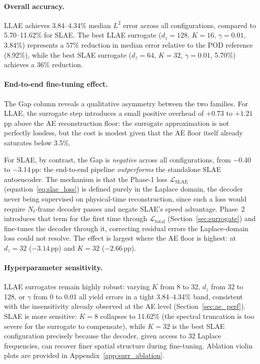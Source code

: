 ﻿\documentclass[a4paper,12pt]{article}
\theoremstyle{definition}
\theoremstyle{remark}
\begin{document}
\paragraph{Overall accuracy.}
LLAE achieves 3.84--4.34\% median $L^2$ error across all configurations, compared to 5.70--11.62\% for SLAE. The best LLAE surrogate ($d_z=128$, $K=16$, $\gamma=0.01$, 3.84\%) represents a $57\%$ reduction in median error relative to the POD reference (8.92\%), while the best SLAE surrogate ($d_z=64$, $K=32$, $\gamma=0.01$, 5.70\%) achieves a $36\%$ reduction.


\paragraph{End-to-end fine-tuning effect.}
The Gap column reveals a qualitative asymmetry between the two families. For LLAE, the surrogate step introduces a small positive overhead of $+0.73$ to $+1.21$\,pp above the AE reconstruction floor: the surrogate approximation is not perfectly lossless, but the cost is modest given that the AE floor itself already saturates below 3.5\%.

For SLAE, by contrast, the Gap is \emph{negative} across all configurations, from $-0.40$ to $-3.14$\,pp: the end-to-end pipeline \emph{outperforms} the standalone SLAE autoencoder. The mechanism is that the Phase-1 loss $\mathcal{L}_{\mathrm{SLAE}}$ (equation~\eqref{eq:slae_loss}) is defined purely in the Laplace domain, the decoder never being supervised on physical-time reconstruction, since such a loss would require $N_t$-frame decoder passes and negate SLAE's speed advantage. Phase~2 introduces that term for the first time through $\mathcal{L}_{\mathrm{total}}$ (Section~\ref{sec:surrogate}) and fine-tunes the decoder through it, correcting residual errors the Laplace-domain loss could not resolve. The effect is largest where the AE floor is highest: at $d_z=32$ ($-3.14$\,pp) and $K=32$ ($-2.66$\,pp).

\paragraph{Hyperparameter sensitivity.}
LLAE surrogates remain highly robust: varying $K$ from 8 to 32, $d_z$ from 32 to 128, or $\gamma$ from 0 to 0.01 all yield errors in a tight 3.84--4.34\% band, consistent with the insensitivity already observed at the AE level (Section~\ref{sec:ae_perf}). SLAE is more sensitive: $K=8$ collapses to 11.62\% (the spectral truncation is too severe for the surrogate to compensate), while $K=32$ is the best SLAE configuration precisely because the decoder, given access to 32 Laplace frequencies, can recover finer spatial structure during fine-tuning. Ablation violin plots are provided in Appendix~\ref{app:surr_ablation}.
\end{document}
